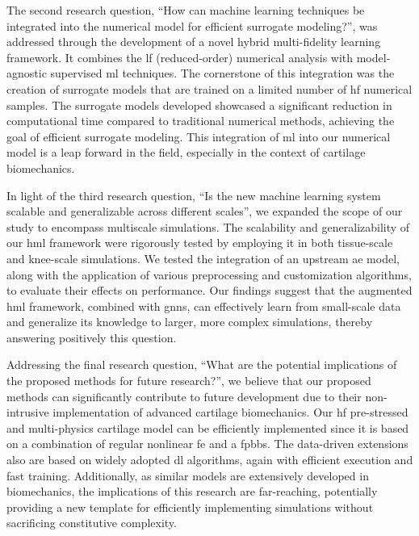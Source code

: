 The second research question, ``How can machine learning techniques be integrated into the numerical model for efficient surrogate modeling?'', was addressed through the development of a novel hybrid multi-fidelity learning framework. It combines the \ac{lf} (reduced-order) numerical analysis with model-agnostic supervised \ac{ml} techniques. The cornerstone of this integration was the creation of surrogate models that are trained on a limited number of \ac{hf} numerical samples. The surrogate models developed showcased a significant reduction in computational time compared to traditional numerical methods, achieving the goal of efficient surrogate modeling. This integration of \ac{ml} into our numerical model is a leap forward in the field, especially in the context of cartilage biomechanics.

In light of the third research question, ``Is the new machine learning system scalable and generalizable across different scales'', we expanded the scope of our study to encompass multiscale simulations. The scalability and generalizability of our \ac{hml} framework were rigorously tested by employing it in both tissue-scale and knee-scale simulations. We tested the integration of an upstream \ac{ae} model, along with the application of various preprocessing and customization algorithms, to evaluate their effects on performance. Our findings suggest that the augmented \ac{hml} framework, combined with \acp{gnn}, can effectively learn from small-scale data and generalize its knowledge to larger, more complex simulations, thereby answering positively this question.

Addressing the final research question, ``What are the potential implications of the proposed methods for future research?'', we believe that our proposed methods can significantly contribute to future development due to their non-intrusive implementation of advanced cartilage biomechanics. Our \ac{hf} pre-stressed and multi-physics cartilage model can be efficiently implemented since it is based on a combination of regular nonlinear \ac{fe} and a \ac{fpbbs}. The data-driven extensions also are based on widely adopted \ac{dl} algorithms, again with efficient execution and fast training. Additionally, as similar models are extensively developed in biomechanics, the implications of this research are far-reaching, potentially providing a new template for efficiently implementing simulations without sacrificing constitutive complexity.

